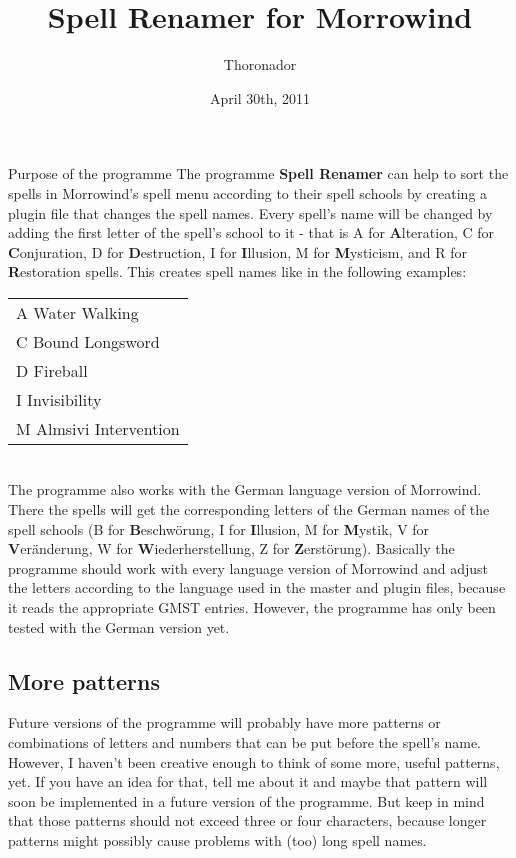 \documentclass[12pt,oneside,a4paper]{article}
\title{Spell Renamer for Morrowind}
\author{Thoronador}
\date{April 30th, 2011}
\begin{document}
\maketitle

\begin{section}{Purpose of the programme}
The programme \textbf{Spell Renamer} can help to sort the spells in Morrowind's
spell menu according to their spell schools by creating a plugin file that
changes the spell names.
Every spell's name will be changed by adding the first letter of the spell's school
to it - that is A for \textbf{A}lteration, C for \textbf{C}onjuration,
D for \textbf{D}estruction, I for \textbf{I}llusion, M for \textbf{M}ysticism,
and R for \textbf{R}estoration spells.
This creates spell names like in the following examples:\\

\begin{tabular}{l}
A Water Walking\\
C Bound Longsword\\
D Fireball\\
I Invisibility\\
M Almsivi Intervention\\
\end{tabular}
\\

The programme also works with the German language version of Morrowind. There
the spells will get the corresponding letters of the German names of the spell
schools (B for \textbf{B}eschw\"{o}rung, I for \textbf{I}llusion, M for
\textbf{M}ystik, V for \textbf{V}er\"{a}nderung, W for \textbf{W}iederherstellung,
Z for \textbf{Z}erst\"{o}rung).
Basically the programme should work with every language version of Morrowind and
adjust the letters according to the language used in the master and plugin files,
because it reads the appropriate GMST entries. However, the programme has only
been tested with the German version yet.

\subsection{More patterns}
Future versions of the programme will probably have more patterns or combinations
of letters and numbers that can be put before the spell's name. However, I haven't
been creative enough to think of some more, useful patterns, yet. If you have an
idea for that, tell me about it and maybe that pattern will soon be implemented
in a future version of the programme. But keep in mind that those patterns
should not exceed three or four characters, because longer patterns might
possibly cause problems with (too) long spell names.


\end{section}
\end{document}

